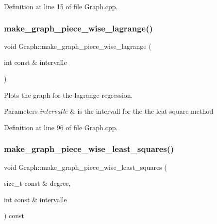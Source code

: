 Definition at line 15 of file Graph.\+cpp.

\mbox{\label{class_graph_a4de7bd5074f188b470392920df1c7ada}} 
\subsubsection{\texorpdfstring{make\+\_\+graph\+\_\+piece\+\_\+wise\+\_\+lagrange()}{make\_graph\_piece\_wise\_lagrange()}}
{\footnotesize\ttfamily void Graph\+::make\+\_\+graph\+\_\+piece\+\_\+wise\+\_\+lagrange (\begin{DoxyParamCaption}\item[{int const \&}]{intervalle }\end{DoxyParamCaption})}



Plots the graph for the lagrange regression. 


\begin{DoxyParams}{Parameters}
{\em intervalle} & is the intervall for the the leat square method \\
\hline
\end{DoxyParams}


Definition at line 96 of file Graph.\+cpp.

\mbox{\label{class_graph_a00bb733092d1c97735b6fbc767a8cedf}} 
\subsubsection{\texorpdfstring{make\+\_\+graph\+\_\+piece\+\_\+wise\+\_\+least\+\_\+squares()}{make\_graph\_piece\_wise\_least\_squares()}}
{\footnotesize\ttfamily void Graph\+::make\+\_\+graph\+\_\+piece\+\_\+wise\+\_\+least\+\_\+squares (\begin{DoxyParamCaption}\item[{size\+\_\+t const \&}]{degree,  }\item[{int const \&}]{intervalle }\end{DoxyParamCaption}) const}



